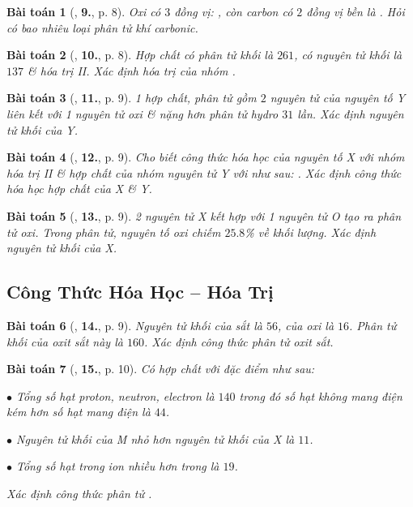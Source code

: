 \documentclass{article}
\numberwithin{equation}{section}
\newtheorem{baitoan}{Bài toán}[section]
\begin{document}
\begin{baitoan}[\cite{An2011}, \textbf{9.}, p. 8]
	Oxi có $3$ đồng vị: , còn carbon có $2$ đồng vị bền là . Hỏi có bao nhiêu loại phân tử khí carbonic.
\end{baitoan}

\begin{baitoan}[\cite{An2011}, \textbf{10.}, p. 8]
	Hợp chất  có phân tử khối là $261$,  có nguyên tử khối là $137$ \& hóa trị II. Xác định hóa trị của nhóm .
\end{baitoan}

\begin{baitoan}[\cite{An2011}, \textbf{11.}, p. 9]
	1 hợp chất, phân tử gồm $2$ nguyên tử của nguyên tố Y liên kết với 1 nguyên tử oxi \& nặng hơn phân tử hydro $31$ lần. Xác định nguyên tử khối của Y.
\end{baitoan}

\begin{baitoan}[\cite{An2011}, \textbf{12.}, p. 9]
	Cho biết công thức hóa học của nguyên tố X với nhóm  hóa trị II \& hợp chất của nhóm nguyên tử Y với  như sau: . Xác định công thức hóa học hợp chất của X \& Y.
\end{baitoan}

\begin{baitoan}[\cite{An2011}, \textbf{13.}, p. 9]
	2 nguyên tử X kết hợp với 1 nguyên tử O tạo ra phân tử oxi. Trong phân tử, nguyên tố oxi chiếm $25.8$\% về khối lượng. Xác định nguyên tử khối của X.
\end{baitoan}


\subsection{Công Thức Hóa Học -- Hóa Trị}

\begin{baitoan}[\cite{An2011}, \textbf{14.}, p. 9]
	Nguyên tử khối của sắt là $56$, của oxi là $16$. Phân tử khối của oxit sắt này là $160$. Xác định công thức phân tử oxit sắt.
\end{baitoan}

\begin{baitoan}[\cite{An2011}, \textbf{15.}, p. 10]
	Có hợp chất  với đặc điểm như sau:
	\begin{enumerate*}
		\item[$\bullet$] Tổng số hạt proton, neutron, electron là $140$ trong đó số hạt không mang điện kém hơn số hạt mang điện là $44$.
		\item[$\bullet$] Nguyên tử khối của M nhỏ hơn nguyên tử khối của X là $11$.
		\item[$\bullet$] Tổng số hạt trong ion  nhiều hơn trong  là $19$.
	\end{enumerate*}
	Xác định công thức phân tử .
\end{baitoan}
\end{document}

